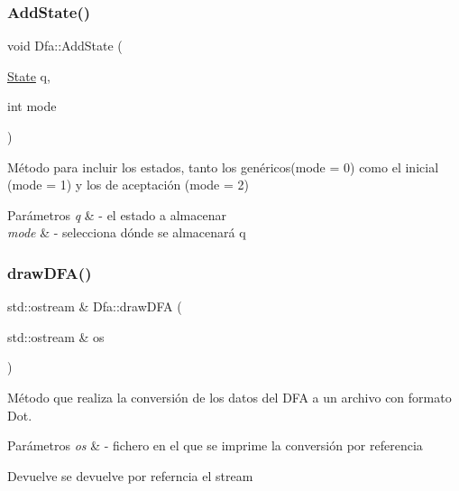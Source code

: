 \subsubsection{\texorpdfstring{Add\+State()}{AddState()}}
{\footnotesize\ttfamily void Dfa\+::\+Add\+State (\begin{DoxyParamCaption}\item[{\hyperlink{classState}{State}}]{q,  }\item[{int}]{mode }\end{DoxyParamCaption})}



Método para incluir los estados, tanto los genéricos(mode = 0) como el inicial (mode = 1) y los de aceptación (mode = 2) 


\begin{DoxyParams}{Parámetros}
{\em q} & -\/ el estado a almacenar \\
\hline
{\em mode} & -\/ selecciona dónde se almacenará q \\
\hline
\end{DoxyParams}
\mbox{\label{classDfa_a643ff03f080320dba8d247efb25d70b0}} 
\subsubsection{\texorpdfstring{draw\+D\+F\+A()}{drawDFA()}}
{\footnotesize\ttfamily std\+::ostream \& Dfa\+::draw\+D\+FA (\begin{DoxyParamCaption}\item[{std\+::ostream \&}]{os }\end{DoxyParamCaption})}



Método que realiza la conversión de los datos del D\+FA a un archivo con formato Dot. 


\begin{DoxyParams}{Parámetros}
{\em os} & -\/ fichero en el que se imprime la conversión por referencia \\
\hline
\end{DoxyParams}
\begin{DoxyReturn}{Devuelve}
se devuelve por referncia el stream 
\end{DoxyReturn}
\mbox{\label{classDfa_ac15e207ccc689d4a48b4c5a5fdf21b6c}} 
